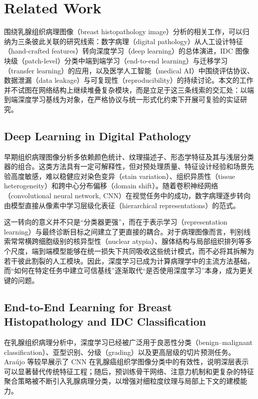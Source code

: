 \section{Related Work}
\label{sec:related_work}

围绕乳腺组织病理图像（breast histopathology image）分析的相关工作，可以归纳为三条彼此关联的研究线索：数字病理（digital pathology）从人工设计特征（hand-crafted features）转向深度学习（deep learning）的总体演进，IDC 图像块级（patch-level）分类中端到端学习（end-to-end learning）与迁移学习（transfer learning）的应用，以及医学人工智能（medical AI）中围绕评估协议、数据泄漏（data leakage）与可复现性（reproducibility）的持续讨论。本文的工作并不试图在网络结构上继续堆叠复杂模块，而是立足于这三条线索的交汇处：以端到端深度学习基线为对象，在严格协议与统一形式化约束下开展可复验的实证研究。

\subsection{Deep Learning in Digital Pathology}

早期组织病理图像分析多依赖颜色统计、纹理描述子、形态学特征及其与浅层分类器的组合。这类方法具有一定可解释性，但对预处理质量、特征设计经验和场景先验高度敏感，难以稳健应对染色变异（stain variation）、组织异质性（tissue heterogeneity）和跨中心分布偏移（domain shift）\cite{Komura2018,Litjens2017}。随着卷积神经网络（convolutional neural network, CNN）在视觉任务中的成功，数字病理逐步转向由模型直接从像素中学习层级化表征（hierarchical representations）的范式\cite{Litjens2017,vanDerLaak2021}。

这一转向的意义并不只是“分类器更强”，而在于表示学习（representation learning）与最终诊断目标之间建立了更直接的耦合。对于病理图像而言，判别线索常常横跨细胞级别的核异型性（nuclear atypia）、腺体结构与局部组织排列等多个尺度，端到端模型能够在统一损失下共同吸收这些统计模式，而不必将其拆解为若干彼此割裂的人工模块\cite{vanDerLaak2021,Huang2025,Rad2025}。因此，深度学习已成为计算病理学中的主流方法基础，而“如何在特定任务中建立可信基线”逐渐取代“是否使用深度学习”本身，成为更关键的问题。

\subsection{End-to-End Learning for Breast Histopathology and IDC Classification}

在乳腺组织病理分析中，深度学习已经被广泛用于良恶性分类（benign--malignant classification）、亚型识别、分级（grading）以及更高层级的切片预测任务\cite{Araujo2017,Hameed2020,Yan2020}。Ara{\'u}jo 等较早展示了 CNN 在乳腺癌组织学图像分类中的有效性，说明深层表示可以显著替代传统特征工程\cite{Araujo2017}；随后，预训练骨干网络、注意力机制和更复杂的特征聚合策略被不断引入乳腺病理分类，以增强对细粒度纹理与局部上下文的建模能力\cite{Yan2020,Zou2022}。

